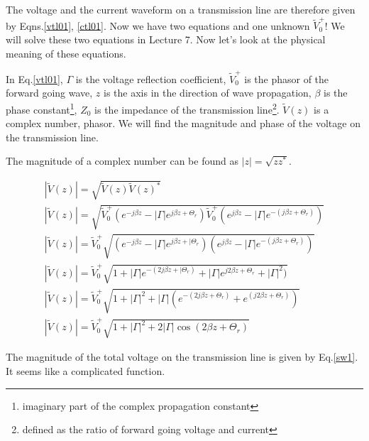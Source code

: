 \documentclass{ximera}
\begin{document}
The voltage and the current waveform on a transmission line are
therefore given by Eqns.\ref{vtl01}, \ref{ctl01}. Now we have two
equations and one unknown $\tilde{V}_0^+$! We will solve these two equations
in Lecture 7. Now let's look at the physical meaning of these
equations.


In Eq.\ref{vtl01}, $\Gamma$ is the voltage reflection coefficient,
$\tilde{V}_0^+$ is the phasor of the forward going wave, $z$ is the axis in
the direction of wave propagation, $\beta$ is the phase
constant\footnote{imaginary part of the complex propagation constant},
$Z_0$ is the impedance of the transmission line\footnote{defined as
the ratio of forward going voltage and current}. $\tilde{V}(z)$ is a complex
number, phasor. We will find the magnitude and phase of the voltage on
the transmission line.




The magnitude of a complex number can be found as $|z|=\sqrt{z
z^*}$.

\begin{eqnarray}
|\tilde{V}(z)|=\sqrt{\tilde{V}(z) \tilde{V}(z)^*} \nonumber  \\
|\tilde{V}(z)|=\sqrt{   \tilde{V}_0^+ (e^{-j \beta z} - |\Gamma|  e^{j \beta z +
 \Theta_r}  )  
   \tilde{V}_0^+ (e^{j \beta z} - |\Gamma|  e^{-(j \beta z + \Theta_r)}     )} \nonumber
\\
|\tilde{V}(z)|= \tilde{V}_0^+ \sqrt{(e^{-j \beta z} - |\Gamma|  e^{j \beta z +
|\Theta_r}  )  
  (e^{j \beta z} - |\Gamma|  e^{-(j \beta z + \Theta_r)}     )}
\nonumber \\
|\tilde{V}(z)|= \tilde{V}_0^+ \sqrt{1+  |\Gamma|  e^{-(2j \beta z +
|\Theta_r)}    + |\Gamma|  e^{j 2 \beta z + \Theta_r} +|\Gamma|^2     )}
\nonumber \\
|\tilde{V}(z)|= \tilde{V}_0^+ \sqrt{1+ |\Gamma|^2 + |\Gamma| ( e^{-(2j \beta z +
 \Theta_r)}   +  e^{(j 2 \beta z + \Theta_r)}     )}
 \nonumber \\
|\tilde{V}(z)|= \tilde{V}_0^+  \sqrt{1+ |\Gamma|^2 + 2 |\Gamma| \cos(2 \beta z +\Theta_r)} \label{sw1} 
\end{eqnarray}

The magnitude of the total voltage on the transmission line is given
by Eq.\ref{sw1}. It seems like a complicated function.
\end{document}
